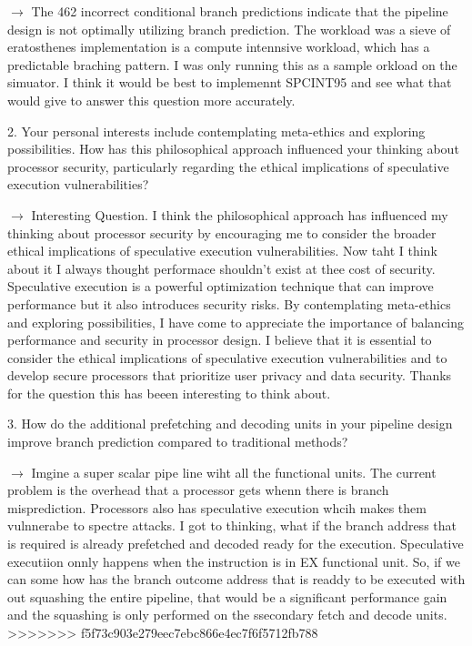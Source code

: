 $\longrightarrow$ The 462 incorrect conditional branch predictions indicate that the pipeline design is not optimally utilizing branch prediction. The workload was a sieve of eratosthenes implementation is a compute intennsive workload, which has a predictable braching pattern. I was only running this as a sample orkload on the simuator. I think it would be best to implemennt SPCINT95 and see what that would give to answer this question more accurately.

2. Your personal interests include contemplating meta-ethics and exploring possibilities. How has this philosophical approach influenced your thinking about processor security, particularly regarding the ethical implications of speculative execution vulnerabilities?

$\longrightarrow$ Interesting Question. I think the philosophical approach has influenced my thinking about processor security by encouraging me to consider the broader ethical implications of speculative execution vulnerabilities. Now taht I think about it I always thought performace shouldn't exist at thee cost of security.
Speculative execution is a powerful optimization technique that can improve performance but it also introduces security risks. By contemplating meta-ethics and exploring possibilities, I have come to appreciate the importance of balancing performance and security in processor design. I believe that it is essential to consider the ethical implications of speculative execution vulnerabilities and to develop secure processors that prioritize user privacy and data security.
Thanks for the question this has beeen interesting to think about. 

3. How do the additional prefetching and decoding units in your pipeline design improve branch prediction compared to traditional methods?

$\longrightarrow$ Imgine a super scalar pipe line wiht all the functional units. The current problem is the overhead that a processor gets whenn there is branch misprediction. Processors also has speculative execution whcih makes them vulnnerabe to spectre attacks. 
I got to thinking, what if the branch address that is required is already prefetched and decoded ready for the execution. Speculative executiion onnly happens when the instruction is in EX functional unit. So, if we can some how has the branch outcome address that is readdy to be executed with out squashing the entire pipeline, that would be a significant performance gain and the squashing is only performed on the ssecondary fetch and decode units. 
>>>>>>> f5f73c903e279eec7ebc866e4ec7f6f5712fb788
